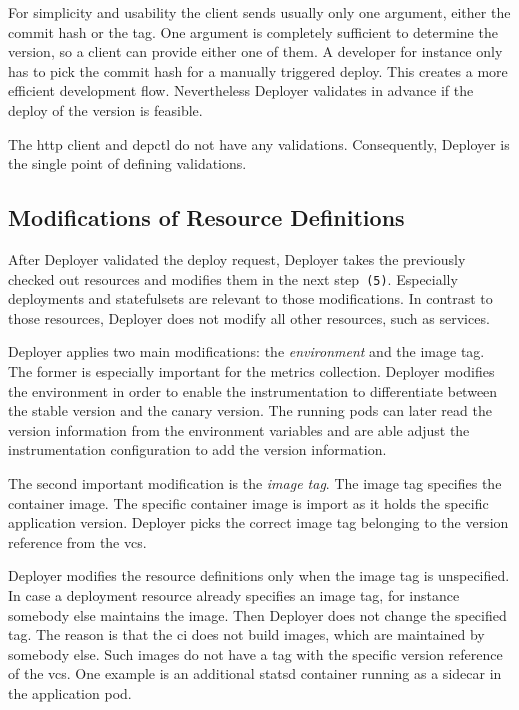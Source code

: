 For simplicity and usability the client sends usually only one argument, either the commit
hash or the tag. One argument is completely sufficient to determine the version, so a
client can provide either one of them. A developer for instance only has to pick the
commit hash for a manually triggered deploy. This creates a more efficient development
flow. Nevertheless Deployer validates in advance if the deploy of the version is feasible.

The http client and depctl do not have any validations. Consequently, Deployer is the
single point of defining validations.

\subsection{Modifications of Resource Definitions}

After Deployer validated the deploy request, Deployer takes the previously checked out
resources and modifies them in the next step~\texttt{(5)}. Especially deployments and
statefulsets are relevant to those modifications. In contrast to those resources, Deployer
does not modify all other resources, such as services.

Deployer applies two main modifications: the \emph{environment} and the image tag. The
former is especially important for the metrics collection. Deployer modifies the
environment in order to enable the instrumentation to differentiate between the stable
version and the canary version. The running pods can later read the version information
from the environment variables and are able adjust the instrumentation configuration to
add the version information.

The second important modification is the \emph{image tag}. The image tag specifies the
container image. The specific container image is import as it holds the specific
application version. Deployer picks the correct image tag belonging to the version
reference from the \gls{vcs}.

Deployer modifies the resource definitions only when the image tag is unspecified. In case
a deployment resource already specifies an image tag, for instance somebody else maintains
the image. Then Deployer does not change the specified tag. The reason is that the
\gls{ci} does not build images, which are maintained by somebody else. Such images do not
have a tag with the specific version reference of the \gls{vcs}. One example is an
additional statsd container running as a sidecar in the application pod.

